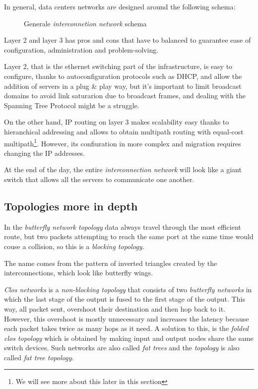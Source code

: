 \bigskip\noindent
In general, data centers networks are designed around the following schema:
\begin{figure}[h!]
    \centering
    \caption{Generale \emph{interconnetion network} schema}
\end{figure}

\noindent
Layer 2 and layer 3 has pros and cons that have to balanced to guarantee ease
of configuration, administration and problem-solving.

Layer 2, that is the ethernet switching part of the infrastructure, is easy to
configure, thanks to autoconfiguration protocols such as DHCP, and allow the
addition of servers in a plug \& play way, but it's important to limit broadcast
domains to avoid link saturarion due to broadcast frames, and dealing with the
Spanning Tree Protocol might be a struggle.

On the other hand, IP routing on layer 3 makes scalability easy thanks to
hieranchical addressing and allows to obtain multipath routing with equal-cost
multipath\footnote{We will see more about this later in this section}. However,
its confiuration in more complex and migration requires changing the IP addresses.

\begin{note}
    At the end of the day, the entire \emph{interconnection network} will look
    like a giant switch that allows all the servers to communicate one another.
\end{note}

\subsection{Topologies more in depth}
In the \emph{butterfly network topology} data always travel through the most
efficient route, but two packets attempting to reach the same port at the same
time would couse a collision, so this is a \emph{blocking topology}.
\begin{note}
    The name comes from the pattern of inverted triangles created by the
    interconnections, which look like butterfly wings.
\end{note}
\emph{Clos networks} is a \emph{non-blocking topology} that consists of two
\emph{butterfly networks} in which the last stage of the output is fused to the
first stage of the output. This way, all packet sent, overshoot their destination
and then hop back to it. However, this overshoot is mostly unnecessary and
increases the latency because each packet takes twice as many hops as it need.
A solution to this, is the \emph{folded clos topology} which is obtained by
making input and output nodes share the same switch devices. Such networks are
also called \emph{fat trees} and the \emph{topology} is also called
\emph{fat tree topology}.

